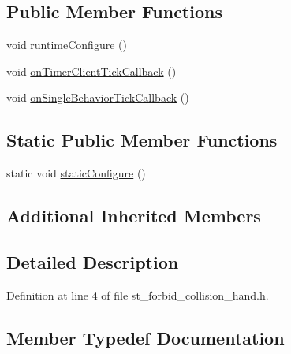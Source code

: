 \subsection*{Public Member Functions}
\begin{DoxyCompactItemize}
\item 
void \hyperlink{structsm__mtc__picknplace_1_1StForbidCollisionHand_abfe10c26242d1d87fcf063b7cf8839c1}{runtime\+Configure} ()
\item 
void \hyperlink{structsm__mtc__picknplace_1_1StForbidCollisionHand_a29865281e5de9e6c5564561751afbef1}{on\+Timer\+Client\+Tick\+Callback} ()
\item 
void \hyperlink{structsm__mtc__picknplace_1_1StForbidCollisionHand_a91e7e8c18b432aa1f4966adbd2e258f7}{on\+Single\+Behavior\+Tick\+Callback} ()
\end{DoxyCompactItemize}
\subsection*{Static Public Member Functions}
\begin{DoxyCompactItemize}
\item 
static void \hyperlink{structsm__mtc__picknplace_1_1StForbidCollisionHand_ac418019bd0ec196f840128f68f5881f2}{static\+Configure} ()
\end{DoxyCompactItemize}
\subsection*{Additional Inherited Members}


\subsection{Detailed Description}


Definition at line 4 of file st\+\_\+forbid\+\_\+collision\+\_\+hand.\+h.



\subsection{Member Typedef Documentation}
